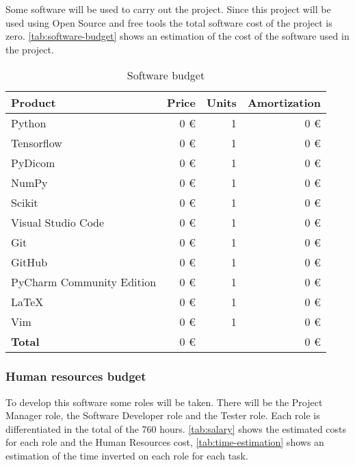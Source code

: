 Some software will be used to carry out the project. Since this project will be used using
Open Source and free tools the total software cost of the project is zero. 
\autoref{tab:software-budget} shows an estimation of the cost of the software used in the 
project.

\begin{table}[H]
  \centering
  \begin{tabular}{|l|r|r|r|}
    \hline
    \textbf{Product} & \textbf{Price} & \textbf{Units} & \textbf{Amortization} \\ \hline\hline

    Python & 0 € & 1 & 0 € \\ \hline
    Tensorflow & 0 € & 1 & 0 € \\ \hline
    PyDicom & 0 € & 1 & 0 € \\ \hline
    NumPy & 0 € & 1 & 0 € \\ \hline
    Scikit & 0 € & 1 & 0 € \\ \hline
    Visual Studio Code & 0 € & 1 & 0 € \\ \hline
    Git & 0 € & 1 & 0 € \\ \hline
    GitHub & 0 € & 1 & 0 € \\ \hline
    PyCharm Community Edition & 0 € & 1 & 0 € \\ \hline
    \LaTeX & 0 € & 1 & 0 € \\ \hline
    Vim & 0 € & 1 & 0 € \\ \hline

    \hline\hline
    \textbf{Total} & 0 € &  & 0  € \\ \hline
  \end{tabular}
  \caption{Software budget \label{tab:software-budget}}
\end{table}


\subsubsection{Human resources budget}

To develop this software some roles will be taken. There will be the Project Manager role,
the Software Developer role and the Tester role. Each role is differentiated in the total
of the 760 hours. \autoref{tab:salary} shows the estimated costs for each role and the
Human Resources cost, \autoref{tab:time-estimation} shows an estimation of the time 
inverted on each role for each task.

